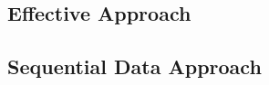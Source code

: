 
        \subsection{Effective Approach} \label{sec:goodsplit}


                

        \subsection{Sequential Data Approach} \label{sec:seqsplit}
                
